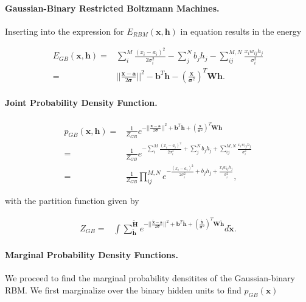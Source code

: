 \documentclass[%
oneside,                 %
final,                   %
10pt]{article}
\begin{document}
\paragraph{Gaussian-Binary Restricted Boltzmann Machines.}
Inserting into the expression for $E_{RBM}(\bm{x},\bm{h})$ in equation  results in the energy

\begin{align}
	E_{GB}(\bm{x}, \bm{h}) =& \sum_i^M \frac{(x_i - a_i)^2}{2\sigma_i^2}
	- \sum_j^N b_j h_j 
	-\sum_{ij}^{M,N} \frac{x_i w_{ij} h_j}{\sigma_i^2} \nonumber \\
	=& \vert\vert\frac{\bm{x} -\bm{a}}{2\bm{\sigma}}\vert\vert^2 - \bm{b}^T \bm{h} 
	- (\frac{\bm{x}}{\bm{\sigma}^2})^T \bm{W}\bm{h} . 
\end{align}

\paragraph{Joint Probability Density Function.}
\begin{align}
	p_{GB} (\bm{x}, \bm{h}) =& \frac{1}{Z_{GB}} e^{-\vert\vert\frac{\bm{x} -\bm{a}}{2\bm{\sigma}}\vert\vert^2 + \bm{b}^T \bm{h} 
	+ (\frac{\bm{x}}{\bm{\sigma}^2})^T \bm{W}\bm{h}} \nonumber \\
	=& \frac{1}{Z_{GB}} e^{- \sum_i^M \frac{(x_i - a_i)^2}{2\sigma_i^2}
	+ \sum_j^N b_j h_j 
	+\sum_{ij}^{M,N} \frac{x_i w_{ij} h_j}{\sigma_i^2}} \nonumber \\
	=& \frac{1}{Z_{GB}} \prod_{ij}^{M,N} e^{-\frac{(x_i - a_i)^2}{2\sigma_i^2}
	+ b_j h_j 
	+\frac{x_i w_{ij} h_j}{\sigma_i^2}} ,
\end{align}

with the partition function given by

\begin{align}
	Z_{GB} =& \int \sum_{\tilde{\bm{h}}}^{\tilde{\bm{H}}} e^{-\vert\vert\frac{\tilde{\bm{x}} -\bm{a}}{2\bm{\sigma}}\vert\vert^2 + \bm{b}^T \tilde{\bm{h}} 
	+ (\frac{\tilde{\bm{x}}}{\bm{\sigma}^2})^T \bm{W}\tilde{\bm{h}}} d\tilde{\bm{x}} .
\end{align}

\paragraph{Marginal Probability Density Functions.}
We proceed to find the marginal probability densitites of the
Gaussian-binary RBM. We first marginalize over the binary hidden units
to find $p_{GB} (\bm{x})$
\end{document}
